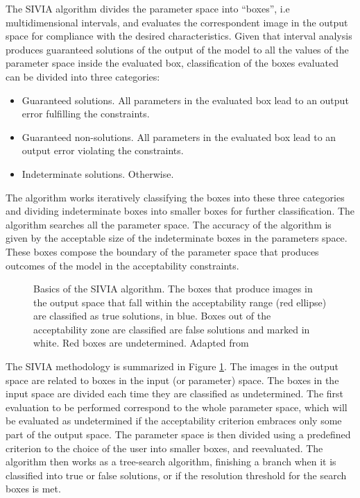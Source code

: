 The SIVIA algorithm divides the parameter space into ``boxes'', i.e multidimensional intervals, and evaluates the correspondent image in the output space for compliance with the desired characteristics. Given that interval analysis produces guaranteed solutions of the output of the model to all the values of the parameter space inside the evaluated box, classification of the boxes evaluated can be divided into three categories:
\begin{itemize}
	\item Guaranteed solutions. All parameters in the evaluated box lead to an output error fulfilling the constraints.
	\item Guaranteed non-solutions. All parameters in the evaluated box lead to an output error violating the constraints.
	\item Indeterminate solutions. Otherwise.
\end{itemize}
The algorithm works iteratively classifying the boxes into these three categories and dividing indeterminate boxes into smaller boxes for further classification. The algorithm searches all the parameter space. The accuracy of the algorithm is given by the acceptable size of the indeterminate boxes in the parameters space. These boxes compose the boundary of the parameter space that produces outcomes of the model in the acceptability constraints.
\begin{figure}[hbtp]
\centering
{}\caption{Basics of the SIVIA algorithm. The boxes that produce images in the output space that fall within the acceptability range (red ellipse) are classified as true solutions, in blue. Boxes out of the acceptability zone are classified are false solutions and marked in white. Red boxes are undetermined. Adapted from \cite{jorgeibolus}}
\label{fig:sivia}
\end{figure}
The SIVIA methodology is summarized in Figure \ref{fig:sivia}. The images in the output space are related to boxes in the input (or parameter) space. The boxes in the input space are divided each time they are classified as undetermined. The first evaluation to be performed correspond to the whole parameter space, which will be evaluated as undetermined if the acceptability criterion embraces only some part of the output space. The parameter space is then divided using a predefined criterion to the choice of the user into smaller boxes, and reevaluated. The algorithm then works as a tree-search algorithm, finishing a branch when it is classified into true or false solutions, or if the resolution threshold for the search boxes is met.
